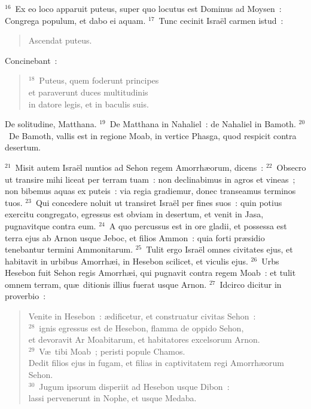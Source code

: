 ${}^{16}$~Ex eo loco apparuit puteus, super quo locutus est Dominus ad Moysen~: Congrega populum, et dabo ei aquam.
${}^{17}$~Tunc cecinit Isra\"el carmen istud~: \begin{flushleft}\begin{verse}Ascendat puteus.\end{verse}\end{flushleft}

 Concinebant~:
\begin{flushleft}\begin{verse}${}^{18}$~Puteus, quem foderunt principes\\ et paraverunt duces multitudinis\\ in datore legis, et in baculis suis.\end{verse}\end{flushleft}

 De solitudine, Matthana.
${}^{19}$~De Matthana in Nahaliel~: de Nahaliel in Bamoth.
${}^{20}$~De Bamoth, vallis est in regione Moab, in vertice Phasga, quod respicit contra desertum.


${}^{21}$~Misit autem Isra\"el nuntios ad Sehon regem Amorrh\ae orum, dicens~:
${}^{22}$~Obsecro ut transire mihi liceat per terram tuam~: non declinabimus in agros et vineas~; non bibemus aquas ex puteis~: via regia gradiemur, donec transeamus terminos tuos.
${}^{23}$~Qui concedere noluit ut transiret Isra\"el per fines suos~: quin potius exercitu congregato, egressus est obviam in desertum, et venit in Jasa, pugnavitque contra eum.
${}^{24}$~A quo percussus est in ore gladii, et possessa est terra ejus ab Arnon usque Jeboc, et filios Ammon~: quia forti pr\ae sidio tenebantur termini Ammonitarum.
${}^{25}$~Tulit ergo Isra\"el omnes civitates ejus, et habitavit in urbibus Amorrh\ae i, in Hesebon scilicet, et viculis ejus.
${}^{26}$~Urbs Hesebon fuit Sehon regis Amorrh\ae i, qui pugnavit contra regem Moab~: et tulit omnem terram, qu\ae\ ditionis illius fuerat usque Arnon.
${}^{27}$~Idcirco dicitur in proverbio~: \begin{flushleft}\begin{verse}Venite in Hesebon~: \ae dificetur, et construatur civitas Sehon~:\\
${}^{28}$~ignis egressus est de Hesebon, flamma de oppido Sehon,\\ et devoravit Ar Moabitarum, et habitatores excelsorum Arnon.\\
${}^{29}$~V\ae\ tibi Moab~; peristi popule Chamos.\\ Dedit filios ejus in fugam, et filias in captivitatem regi Amorrh\ae orum Sehon.\\
${}^{30}$~Jugum ipsorum disperiit ad Hesebon usque Dibon~:\\ lassi pervenerunt in Nophe, et usque Medaba.\end{verse}\end{flushleft}


